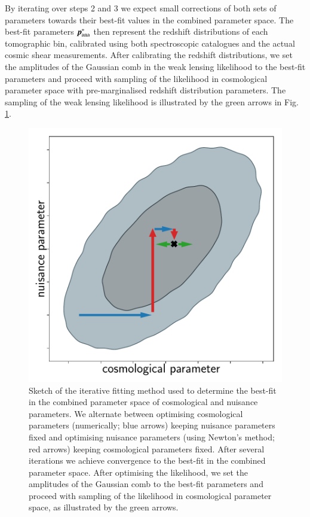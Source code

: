 \documentclass{aa}
\begin{document}
By iterating over steps 2 and 3 we expect small corrections of both sets of parameters towards their best-fit values in the combined parameter space. The best-fit parameters $\boldsymbol{p}^*_{\rm ana}$ then represent the redshift distributions of each tomographic bin, calibrated using both spectroscopic catalogues and the actual cosmic shear measurements. After calibrating the redshift distributions, we set the amplitudes of the Gaussian comb in the weak lensing likelihood to the best-fit parameters and proceed with sampling of the likelihood in cosmological parameter space with pre-marginalised redshift distribution parameters. The sampling of the weak lensing likelihood is illustrated by the green arrows in Fig. \ref{fig:iterative_calibration}.
\begin{figure}
\centering
\includegraphics[width=\linewidth]{plots/iterative.pdf}
\caption{Sketch of the iterative fitting method used to determine the best-fit in the combined parameter space of cosmological and nuisance parameters. We alternate between optimising cosmological parameters (numerically; blue arrows) keeping nuisance parameters fixed and optimising nuisance parameters (using Newton's method; red arrows) keeping cosmological parameters fixed. After several iterations we achieve convergence to the best-fit in the combined parameter space. After optimising the likelihood, we set the amplitudes of the Gaussian comb to the best-fit parameters and proceed with sampling of the likelihood in cosmological parameter space, as illustrated by the green arrows.}
\label{fig:iterative_calibration}
\end{figure}
\end{document}
